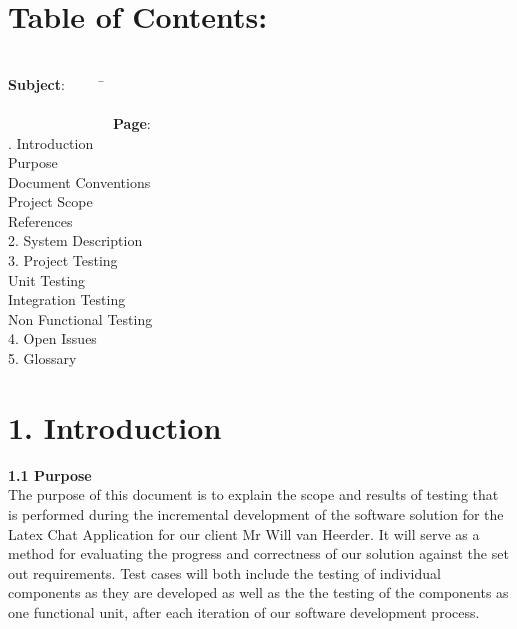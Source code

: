 \documentclass[29pt,a4paper]{moderncv}
\begin{document}
\section{\textbf{Table of Contents:}}
\begin{tabbing}
\\\textbf{Subject}: ~~~~~\= ~~~~~~~~~~~~~~~~~~~~~~~~~~~~~~~~~~~~~~~~~~~~~~~~~~~~~~~~~~~~~~~~~~~~~~~~~~~~~~~~~~~~~~~\= \textbf{Page}:
\\. Introduction \> \\							
 Purpose 	\\							
 Document Conventions 					\\
 Project Scope 							\\
 References 							\\
2. System Description \> 					\\
3. Project Testing \> \\
 Unit Testing \\
 Integration Testing  \\
 Non Functional Testing  \\
4. Open Issues \> \\
5. Glossary \> \\
\end{tabbing}

\newpage
	\section*{\textbf{1. Introduction}}
	\vspace{4mm}
	
		\textbf{1.1 Purpose}
			\\The purpose of this document is to explain the scope and results of testing that is performed during the incremental development of the software solution for the Latex Chat Application for our client Mr Will van Heerder.  It will serve as a method for evaluating the progress and correctness of our solution against the set out requirements. Test cases will both include the testing of individual components as they are developed as well as the the testing of the components as one functional unit, after each iteration of our software development process.   \\
		\vspace{1mm}
		
\end{document}
